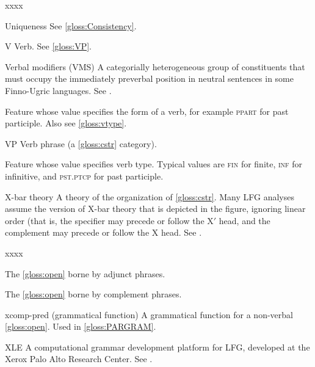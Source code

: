 \documentclass[output=paper,colorlinks,citecolor=brown]{langscibook}
\begin{document}
\begin{labeling}{xxxx}
\item[Uniqueness] See \ref{gloss:Consistency}.

\item[V] Verb. See \ref{gloss:VP}.

\item[Verbal modifiers (VMS)] A categorially heterogeneous group of constituents that must occupy the immediately preverbal position in neutral sentences in some Finno-Ugric languages. See \citet{chapters/FinnoUgric}.

\item[\VFORM] Feature whose value specifies the form of a verb, for example \textsc{ppart} for past participle.  Also see \ref{gloss:vtype}.

\item[VP\namedlabel{gloss:VP}{VP}] Verb phrase (a \ref{gloss:cstr} category).

\item[\VTYPE\namedlabel{gloss:vtype}{\VTYPE}] Feature whose value specifies verb type.  Typical values are \textsc{fin} for finite, \textsc{inf} for infinitive, and \textsc{pst.ptcp} for past participle.

\parpic[r]{\scalebox{.6}{\begin{forest}[XP [{YP\\(Specifier of XP)}][X$'$ [X$^0$] [{ZP\\(Complement of XP)}]]]\end{forest}}}\item[X-bar theory\namedlabel{gloss:Xbar}{X-bar theory}] A theory of the organization of \ref{gloss:cstr}.  Many LFG analyses assume the version of X-bar theory that is depicted in the figure, ignoring linear order (that is, the specifier may precede or follow the X$'$ head, and the complement may precede or follow the X head.  See \citetv[\ref{sect:xbar}]{chapters/CoreConcepts}.
\end{labeling}
\begin{labeling}{xxxx}\sloppy %

\item[\XADJ\namedlabel{gloss:xadj}{\XADJ}]The \ref{gloss:open} borne by adjunct phrases.

\item[\XCOMP\namedlabel{gloss:xcomp}{\XCOMP}] The \ref{gloss:open} borne by complement phrases.

\item[xcomp-pred] (grammatical function) A grammatical function for a non-verbal \ref{gloss:open}. Used in \ref{gloss:PARGRAM}.

\item[XLE\namedlabel{gloss:XLE}{XLE}] A computational grammar development platform for LFG, developed at the Xerox Palo Alto Research Center.  See \citetv[\ref{sec:ImpApp:XLE}]{chapters/ImplementationsApplications}.

\end{labeling}
\end{document}
